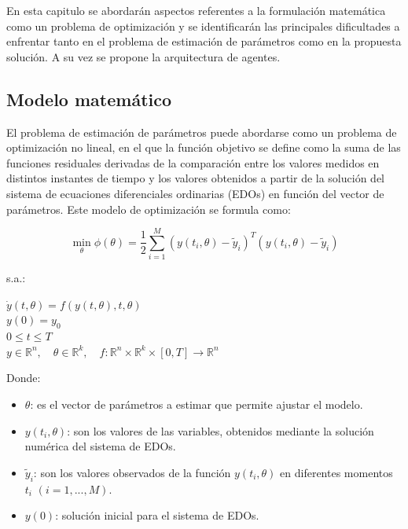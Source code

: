 \documentclass{article}
\begin{document}
        En esta capitulo se abordarán aspectos referentes a la formulación matemática como un problema de optimización y se identificarán las principales dificultades a enfrentar tanto en el problema de estimación de parámetros como en la propuesta solución. A su vez se propone la arquitectura de agentes.

        \subsection*{ Modelo matemático}

        El problema de estimación de parámetros puede abordarse como un problema de optimización no lineal, en el que la función objetivo se define como la suma de las funciones residuales derivadas de la comparación entre los valores medidos en distintos instantes de tiempo y los valores obtenidos a partir de la solución del sistema de ecuaciones diferenciales ordinarias (EDOs) en función del vector de parámetros. Este modelo de optimización se formula como:

    \begin{equation}
        \min_{\theta} \phi(\theta) = \frac{1}{2} \sum_{i=1}^{M} (y(t_i, \theta) - \tilde{y}_i)^T (y(t_i,    \theta) - \tilde{y}_i)
    \end{equation}

    s.a.:


        \begin{center}

        $\dot{y}(t, \theta) = f(y(t, \theta), t, \theta)$ \\
        $y(0) = y_0$ \\
        $0 \leq t \leq T$ \\
        $y \in \mathbb{R}^n, \quad \theta \in \mathbb{R}^k, \quad f : \mathbb{R}^n \times \mathbb{R}^k \times [0, T] \rightarrow \mathbb{R}^n$

        \end{center}

    Donde:
    \begin{itemize}
        \item $\theta$: es el vector de parámetros a estimar que permite ajustar el modelo.
        \item $y(t_i, \theta)$: son los valores de las variables, obtenidos mediante la solución numérica del sistema de EDOs.
        \item $\tilde{y}_i$: son los valores observados de la función $y(t_i, \theta)$ en diferentes momentos $t_i$ $(i = 1, ..., M)$.
        \item $y(0)$: solución inicial para el sistema de EDOs.
    \end{itemize}
\end{document}
